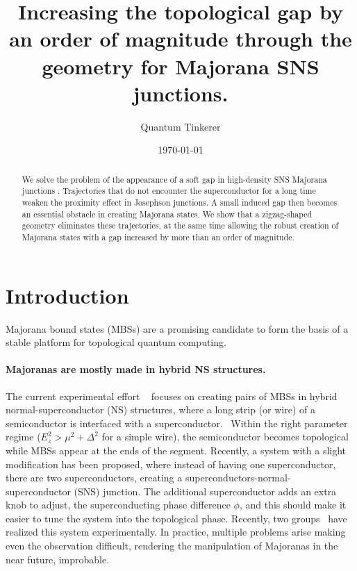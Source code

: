 \documentclass[english, twocolumn, 10pt, aps, superscriptaddress, floatfix, prb, citeautoscript]{revtex4-1}
\renewcommand{\comment}[2]{#2}
\renewcommand{\comment}{\paragraph}
\begin{document}
\title{Increasing the topological gap by an order of magnitude through the geometry for Majorana SNS junctions.}

\author{Quantum Tinkerer}

\date{\today}
\begin{abstract}
We solve the problem of the appearance of a soft gap in high-density SNS Majorana junctions \cite{pientka2017topological}.
Trajectories that do not encounter the superconductor for a long time weaken the proximity effect in Josephson junctions.
A small induced gap then becomes an essential obstacle in creating Majorana states.
We show that a zigzag-shaped geometry eliminates these trajectories, at the same time allowing the robust creation of Majorana states with a gap increased by more than an order of magnitude.
\end{abstract}

\maketitle

\section{Introduction}
Majorana bound states (MBSs) are a promising candidate to form the basis of a stable platform for topological quantum computing. ~\cite{alicea2012new,beenakker2013search}

\comment{Majoranas are mostly made in hybrid NS structures.}
The current experimental effort ~\cite{mourik_signatures_2012,das_zero-bias_2012,deng_anomalous_2012,churchill_superconductor-nanowire_2013,zhang2018quantized} focuses on creating pairs of MBSs in hybrid normal-superconductor (NS) structures, where a long strip (or wire) of a semiconductor is interfaced with a superconductor.~\cite{lutchyn_majorana_2010,oreg_helical_2010}
Within the right parameter regime ($E_z^2>\mu^2+\Delta^2$ for a simple wire), the semiconductor becomes topological while MBSs appear at the ends of the segment.
Recently, a system with a slight modification has been proposed\cite{pientka2017topological}, where instead of having one superconductor, there are two superconductors, creating a superconductors-normal-superconductor (SNS) junction.
The additional superconductor adds an extra knob to adjust, the superconducting phase difference $\phi$, and this should make it easier to tune the system into the topological phase.
Recently, two groups~\cite{fornieri_evidence_2018,ren_topological_2018} have realized this system experimentally.
In practice, multiple problems arise making even the observation difficult, rendering the manipulation of Majoranas in the near future, improbable.
\end{document}
